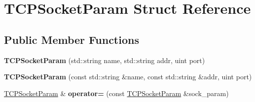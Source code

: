 \hypertarget{struct_t_c_p_socket_param}{\section{T\+C\+P\+Socket\+Param Struct Reference}
\label{struct_t_c_p_socket_param}
}
\subsection*{Public Member Functions}
\begin{DoxyCompactItemize}
\item 
\hypertarget{struct_t_c_p_socket_param_a5f8019ff9672a165db2c225cf86946cb}{{\bfseries T\+C\+P\+Socket\+Param} (std\+::string name, std\+::string addr, uint port)}\label{struct_t_c_p_socket_param_a5f8019ff9672a165db2c225cf86946cb}

\item 
\hypertarget{struct_t_c_p_socket_param_a30919df41998fdf63b706543c55d6bfa}{{\bfseries T\+C\+P\+Socket\+Param} (const std\+::string \&name, const std\+::string \&addr, uint port)}\label{struct_t_c_p_socket_param_a30919df41998fdf63b706543c55d6bfa}

\item 
\hypertarget{struct_t_c_p_socket_param_a1440243b424ee42cf29c972b609b044a}{\hyperlink{struct_t_c_p_socket_param}{T\+C\+P\+Socket\+Param} \& {\bfseries operator=} (const \hyperlink{struct_t_c_p_socket_param}{T\+C\+P\+Socket\+Param} \&sock\+\_\+param)}\label{struct_t_c_p_socket_param_a1440243b424ee42cf29c972b609b044a}

\end{DoxyCompactItemize}
